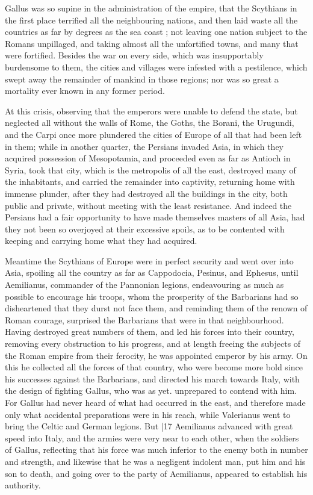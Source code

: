 Gallus was so supine in the administration of the empire, that the Scythians in the first place terrified all the neighbouring nations, and then laid waste all the countries as far by degrees as the sea coast ; not leaving one nation subject to the Romans unpillaged, and taking almost all the unfortified towns, and many that were fortified. Besides the war on every side, which was insupportably burdensome to them, the cities and villages were infested with a pestilence, which swept away the remainder of mankind in those regions; nor was so great a mortality ever known in any former period.

At this crisis, observing that the emperors were unable to defend the state, but neglected all without the walls of Rome, the Goths, the Borani, the Urugundi, and the Carpi once more plundered the cities of Europe of all that had been left in them; while in another quarter, the Persians invaded Asia, in which they acquired possession of Mesopotamia, and proceeded even as far as Antioch in Syria, took that city, which is the metropolis of all the east, destroyed many of the inhabitants, and carried the remainder into captivity, returning home with immense plunder, after they had destroyed all the buildings in the city, both public and private, without meeting with the least resistance. And indeed the Persians had a fair opportunity to have made themselves masters of all Asia, had they not been so overjoyed at their excessive spoils, as to be contented with keeping and carrying home what they had acquired.

Meantime the Scythians of Europe were in perfect security and went over into Asia, spoiling all the country as far as Cappodocia, Pesinus, and Ephesus, until Aemilianus, commander of the Pannonian legions, endeavouring as much as possible to encourage his troops, whom the prosperity of the Barbarians had so disheartened that they durst not face them, and reminding them of the renown of Roman courage, surprised the Barbarians that were in that neighbourhood. Having destroyed great numbers of them, and led his forces into their country, removing every obstruction to his progress, and at length freeing the subjects of the Roman empire from their ferocity, he was appointed emperor by his army. On this he collected all the forces of that country, who were become more bold since his successes against the Barbarians, and directed his march towards Italy, with the design of fighting Gallus, who was as yet. unprepared to contend with him. For Gallus had never heard of what had occurred in the east, and therefore made only what accidental preparations were in his reach, while Valerianus went to bring the Celtic and German legions. But
|17 Aemilianus advanced with great speed into Italy, and the armies were very near to each other, when the soldiers of Gallus, reflecting that his force was much inferior to the enemy both in number and strength, and likewise that he was a negligent indolent man, put him and his son to death, and going over to the party of Aemilianus, appeared to establish his authority.

